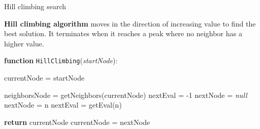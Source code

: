 \documentclass[9pt]{beamer}
\begin{document}
\begin{frame}{Hill climbing search}
\begin{small}

\textbf{Hill climbing algorithm} moves in the direction of increasing value to find the best solution. It terminates when it reaches a peak where no neighbor has a higher value.

\vspace{-2mm}
\textbf{function} \texttt{HillClimbing}(\emph{startNode}):\\

\begin{minipage}{0.10\linewidth}\vspace{0pt}%
\end{minipage}
\hskip10pt
\begin{minipage}{0.90\linewidth}\vspace{0pt}%
\begin{algorithm}[H]
    currentNode = startNode\;
 	{
  		neighborsNode = getNeighbors(currentNode)\;
        nextEval = -1\; 
        nextNode = \emph{null}\;
  		{
  		    {
                nextNode = n\;
                nextEval = getEval(n)\;
            }
  		}
        
  		{
  		    \textbf{return} currentNode\;
  		}
  		currentNode = nextNode\;
  	}
\end{algorithm}
\end{minipage}

\end{small}
\end{frame}
\end{document}
